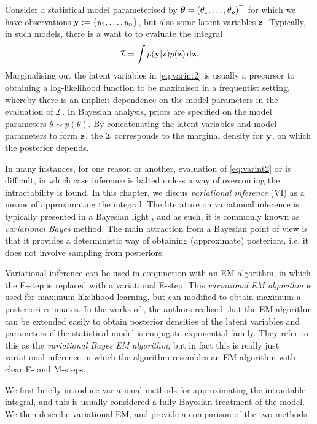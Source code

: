 Consider a statistical model parameterised by ${\bm\theta} = (\theta_1,\dots,\theta_p)^\top$ for which we have observations ${\mathbf y} := \{y_1,\dots,y_n\}$, but also some latent variables ${\mathbf z}$.
Typically, in such models, there is a want to to evaluate the integral 
\begin{equation}\label{eq:varint2} 
  {\mathcal I} = \int p({\mathbf y}|{\mathbf z}) p({\mathbf z}) \operatorname{d}\hspace{0.5pt}\! {\mathbf z},
\end{equation}
Marginalising out the latent variables in \cref{eq:varint2} is usually a precursor to obtaining a log-likelihood function to be maximised in a frequentist setting, whereby there is an implicit dependence on the model parameters in the evaluation of ${\mathcal I}$.
In Bayesian analysis, priors are specified on the model parameters $\theta\sim p(\theta)$.
By concatenating the latent variables and model parameters to form ${\mathbf z}$, the ${\mathcal I}$ corresponds to the marginal density for ${\mathbf y}$, on which the posterior depends.

In many instances, for one reason or another, evaluation of \cref{eq:varint2} or is difficult, in which case inference is halted unless a way of overcoming the intractability is found.
In this chapter, we discus \emph{variational inference} (VI) as a means of approximating the integral.
The literature on variational inference is typically presented in a Bayesian light \citep{jordan1999introduction,bishop2006pattern,blei2017variational}, and as such, it is commonly known as \emph{variational Bayes} method.
The main attraction from a Bayesian point of view is that it provides a deterministic way of obtaining (approximate) posteriors, i.e. it does not involve sampling from posteriors.

Variational inference can be used in conjunction with an EM algorithm, in which the E-step is replaced with a variational E-step.
This \emph{variational EM algorithm} is used for maximum likelihood learning, but can modified to obtain maximum a posteriori estimates.
In the works of \citep{beal2003variational,beal2003}, the authors realised that the EM algorithm can be extended easily to obtain posterior densities of the latent variables and parameters if the statistical model is conjugate exponential family.
They refer to this as the \emph{variational Bayes EM algorithm}, but in fact this is really just variational inference in which the algorithm resembles an EM algorithm with clear E- and M-steps.

We first briefly introduce variational methods for approximating the intractable integral, and this is usually considered a fully Bayesian treatment of the model.
We then describe variational EM, and provide a comparison of the two methods.

